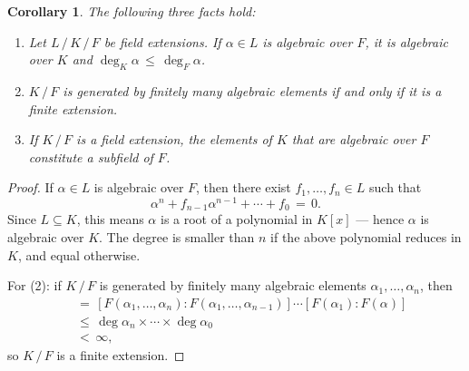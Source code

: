 \documentclass[11pt]{article}
\newtheorem{corollary}{Corollary}
\begin{document}
\begin{adjustwidth}{0.5cm}{}
  \begin{corollary}
    The following three facts hold:
    \begin{enumerate}
      \item Let $L \, / \, K \, / \, F$ be field extensions. If $\alpha \in L$ is algebraic over $F$, it is algebraic over $K$ and $\deg_{K} \alpha \, \le \, \deg_{F} \alpha$.
      \item $K \, / \, F$ is generated by finitely many algebraic elements if and only if it is a finite extension.
      \item If $K \, / \, F$ is a field extension, the elements of $K$ that are algebraic over $F$ constitute a subfield of $F$.
    \end{enumerate}
  \end{corollary}
  \begin{proof}
    If $\alpha \in L$ is algebraic over $F$, then there exist $f_{1}, \ldots, f_{n} \in L$ such that
    \[
      \alpha^{n} + f_{n - 1} \alpha^{n - 1} + \cdots + f_{0} \, = \, 0.
    \]
    Since $L \subseteq K$, this means $\alpha$ is a root of a polynomial in $K[x]$ --- hence $\alpha$ is algebraic over $K$. The degree is smaller than $n$ if the above polynomial reduces in $K$, and equal otherwise.

    For (2): if $K \, / \, F$ is generated by finitely many algebraic elements $\alpha_{1}, \ldots, \alpha_{n}$, then
    \begin{align*}
      [F(\alpha_{1}, \ldots, \alpha_{n}) : F] \, &= \, [F(\alpha_{1}, \ldots, \alpha_{n}) : F(\alpha_{1}, \ldots, \alpha_{n - 1})] \cdots [F(\alpha_{1}) : F(\alpha)] \\
                                                 &\le \, \deg \alpha_{n} \times \cdots \times \deg \alpha_{0} \\
                                                 &< \, \infty,
    \end{align*}
    so $K \, / \, F$ is a finite extension.
  \end{proof}
\end{adjustwidth}

\end{document}
